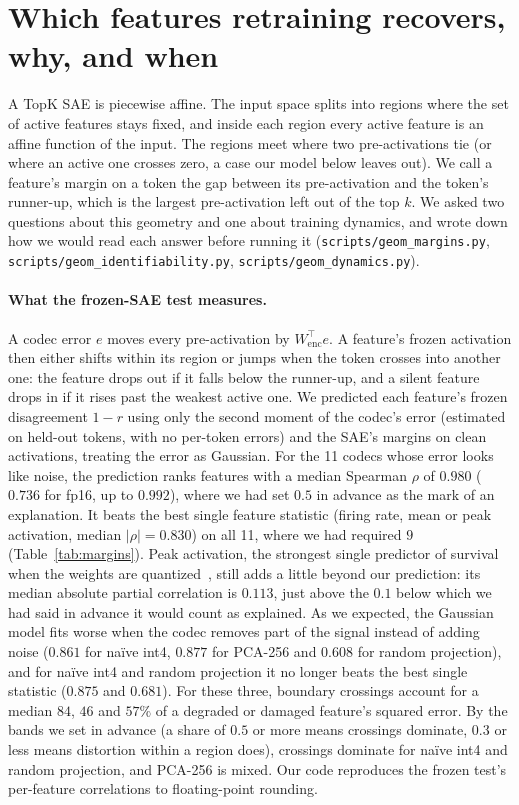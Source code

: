 \documentclass{article}
\begin{document}
\section{Which features retraining recovers, why, and when}
\label{app:margins}
A TopK SAE is piecewise affine. The input space splits into regions
where the set of active features stays fixed, and inside each region
every active feature is an affine function of the input. The regions
meet where two pre-activations tie (or where an active one crosses
zero, a case our model below leaves out). We call a feature's margin on a
token the gap between its pre-activation and the token's runner-up,
which is the largest pre-activation left out of the top $k$. We asked
two questions about this geometry and one about training dynamics, and
wrote down how we would read each answer before running it
(\texttt{scripts/geom\_margins.py}, \texttt{scripts/geom\_identifiability.py},
\texttt{scripts/geom\_dynamics.py}).

\paragraph{What the frozen-SAE test measures.} A codec error $e$ moves
every pre-activation by $W_{\mathrm{enc}}^\top e$. A feature's frozen
activation then either shifts within its region or jumps when the token
crosses into another one: the feature drops out if it falls below the
runner-up, and a silent feature drops in if it rises past the weakest
active one. We predicted each feature's frozen disagreement $1-r$ using
only the second moment of the codec's error (estimated on held-out
tokens, with no per-token errors) and the SAE's margins on clean
activations, treating the error as Gaussian. For the 11 codecs whose
error looks like noise, the prediction ranks features with a median
Spearman $\rho$ of $0.980$ ($0.736$ for fp16, up to $0.992$), where we
had set $0.5$ in advance as the mark of an explanation. It beats the
best single feature statistic (firing rate, mean or peak activation,
median $|\rho| = 0.830$) on all 11, where we had required $9$
(Table~\ref{tab:margins}). Peak activation, the strongest single
predictor of survival when the weights are quantized~\citep{duan},
still adds a little beyond our prediction: its median absolute partial
correlation is $0.113$, just above the $0.1$ below which we had said in
advance it would count as explained. As we expected, the Gaussian model
fits worse when the codec removes part of the signal instead of adding
noise ($0.861$ for na\"ive int4, $0.877$ for PCA-256 and $0.608$ for
random projection), and for na\"ive int4 and random projection it no
longer beats the best single statistic ($0.875$ and $0.681$). For these
three, boundary crossings account for a median $84$, $46$ and $57\%$ of
a degraded or damaged feature's squared error. By the bands we set in
advance (a share of $0.5$ or more means crossings dominate, $0.3$ or
less means distortion within a region does), crossings dominate for
na\"ive int4 and random projection, and PCA-256 is mixed. Our code reproduces the frozen test's per-feature correlations
to floating-point rounding.
\end{document}
